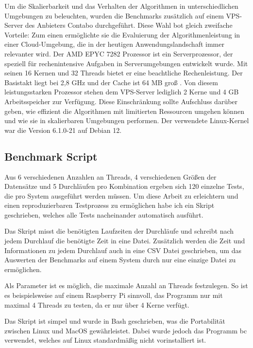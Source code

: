 Um die Skalierbarkeit und das Verhalten der Algorithmen in unterschiedlichen Umgebungen zu beleuchten, wurden die Benchmarks zusätzlich auf einem VPS-Server des Anbieters Contabo durchgeführt. Diese Wahl bot gleich zweifache Vorteile: Zum einen ermöglichte sie die Evaluierung der Algorithmenleistung in einer Cloud-Umgebung, die in der heutigen Anwendungslandschaft immer relevanter wird. 
Der AMD EPYC 7282 Prozessor ist ein Serverprozessor, der speziell für rechenintensive Aufgaben in Serverumgebungen entwickelt wurde. Mit seinen 16 Kernen und 32 Threads bietet er eine beachtliche Rechenleistung. Der Basistakt liegt bei 2,8 GHz und der Cache ist 64 MB groß \citep{Epyc_Specifications}.
Von diesem leistungsstarken Prozessor stehen dem VPS-Server lediglich 2 Kerne und 4 GB Arbeitsspeicher zur Verfügung. Diese Einschränkung sollte Aufschluss darüber geben, wie effizient die Algorithmen mit limitierten Ressourcen umgehen können und wie sie in skalierbaren Umgebungen performen. Der verwendete Linux-Kernel war die Version 6.1.0-21 auf Debian 12.

\subsection{Benchmark Script}

Aus 6 verschiedenen Anzahlen an Threads, 4 verschiedenen Größen der Datensätze und 5 Durchläufen pro Kombination ergeben sich 120 einzelne Tests, die pro System ausgeführt werden müssen.
Um diese Arbeit zu erleichtern und einen reproduzierbaren Testprozess zu ermöglichen habe ich ein Skript geschrieben, welches alle Tests nacheinander automatisch ausführt.

Das Skript misst die benötigten Laufzeiten der Durchläufe und schreibt nach jedem Durchlauf die benötigte Zeit in eine Datei. Zusätzlich werden die Zeit und Informationen zu jedem Durchlauf auch in eine CSV Datei geschrieben, um das Auswerten der Benchmarks auf einem System durch nur eine einzige Datei zu ermöglichen.

Als Parameter ist es möglich, die maximale Anzahl an Threads festzulegen. So ist es beispielsweise auf einem Raspberry Pi sinnvoll, das Programm nur mit maximal 4 Threads zu testen, da er nur über 4 Kerne verfügt.

Das Skript ist simpel und wurde in Bash geschrieben, was die Portabilität zwischen Linux und MacOS gewährleistet. Dabei wurde jedoch das Programm bc verwendet, welches auf Linux standardmäßig nicht vorinstalliert ist.


